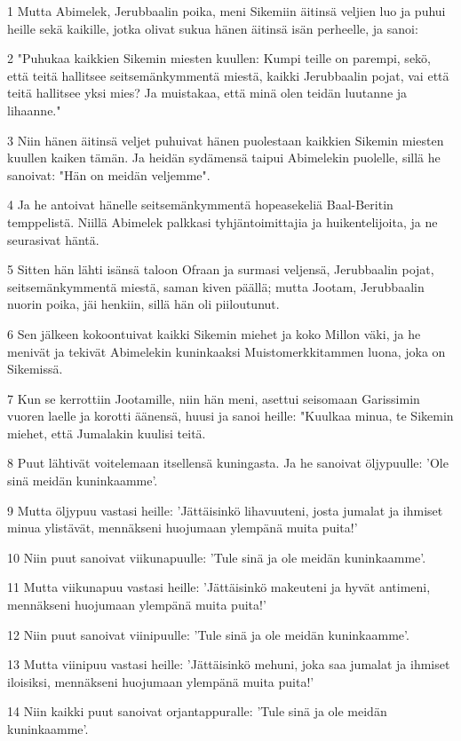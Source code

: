 \par 1 Mutta Abimelek, Jerubbaalin poika, meni Sikemiin äitinsä veljien luo ja puhui heille sekä kaikille, jotka olivat sukua hänen äitinsä isän perheelle, ja sanoi:
\par 2 "Puhukaa kaikkien Sikemin miesten kuullen: Kumpi teille on parempi, sekö, että teitä hallitsee seitsemänkymmentä miestä, kaikki Jerubbaalin pojat, vai että teitä hallitsee yksi mies? Ja muistakaa, että minä olen teidän luutanne ja lihaanne."
\par 3 Niin hänen äitinsä veljet puhuivat hänen puolestaan kaikkien Sikemin miesten kuullen kaiken tämän. Ja heidän sydämensä taipui Abimelekin puolelle, sillä he sanoivat: "Hän on meidän veljemme".
\par 4 Ja he antoivat hänelle seitsemänkymmentä hopeasekeliä Baal-Beritin temppelistä. Niillä Abimelek palkkasi tyhjäntoimittajia ja huikentelijoita, ja ne seurasivat häntä.
\par 5 Sitten hän lähti isänsä taloon Ofraan ja surmasi veljensä, Jerubbaalin pojat, seitsemänkymmentä miestä, saman kiven päällä; mutta Jootam, Jerubbaalin nuorin poika, jäi henkiin, sillä hän oli piiloutunut.
\par 6 Sen jälkeen kokoontuivat kaikki Sikemin miehet ja koko Millon väki, ja he menivät ja tekivät Abimelekin kuninkaaksi Muistomerkkitammen luona, joka on Sikemissä.
\par 7 Kun se kerrottiin Jootamille, niin hän meni, asettui seisomaan Garissimin vuoren laelle ja korotti äänensä, huusi ja sanoi heille: "Kuulkaa minua, te Sikemin miehet, että Jumalakin kuulisi teitä.
\par 8 Puut lähtivät voitelemaan itsellensä kuningasta. Ja he sanoivat öljypuulle: 'Ole sinä meidän kuninkaamme'.
\par 9 Mutta öljypuu vastasi heille: 'Jättäisinkö lihavuuteni, josta jumalat ja ihmiset minua ylistävät, mennäkseni huojumaan ylempänä muita puita!'
\par 10 Niin puut sanoivat viikunapuulle: 'Tule sinä ja ole meidän kuninkaamme'.
\par 11 Mutta viikunapuu vastasi heille: 'Jättäisinkö makeuteni ja hyvät antimeni, mennäkseni huojumaan ylempänä muita puita!'
\par 12 Niin puut sanoivat viinipuulle: 'Tule sinä ja ole meidän kuninkaamme'.
\par 13 Mutta viinipuu vastasi heille: 'Jättäisinkö mehuni, joka saa jumalat ja ihmiset iloisiksi, mennäkseni huojumaan ylempänä muita puita!'
\par 14 Niin kaikki puut sanoivat orjantappuralle: 'Tule sinä ja ole meidän kuninkaamme'.
